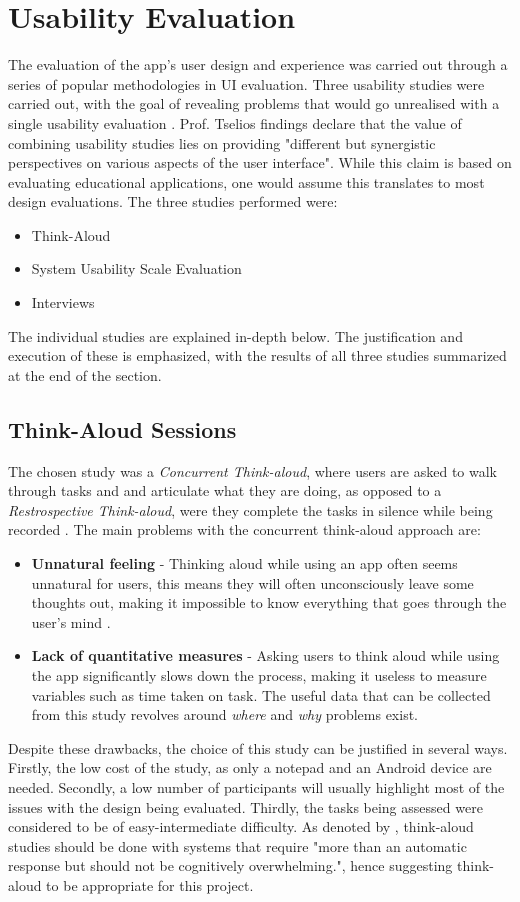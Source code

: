 \section{Usability Evaluation}
The evaluation of the app's user design and experience was carried out through a series of popular methodologies in UI evaluation. Three usability studies were carried out, with the goal of revealing problems that would go unrealised with a single usability evaluation \cite{article}. Prof. Tselios findings declare that the value of combining usability studies lies on providing "different but synergistic perspectives on various aspects of the user interface". While this claim is based on evaluating educational applications, one would assume this translates to most design evaluations. The three studies performed were:
\begin{itemize}
    \item Think-Aloud
    \item System Usability Scale Evaluation
    \item Interviews
\end{itemize}
The individual studies are explained in-depth below. The justification and execution of these is emphasized, with the results of all three studies summarized at the end of the section.
\subsection{Think-Aloud Sessions}
The chosen study was a \emph{Concurrent Think-aloud}, where users are asked to walk through tasks and and articulate what they are doing, as opposed to a  \emph{Restrospective Think-aloud}, were they complete the tasks in silence while being recorded \cite{hanington2012universal}. The main problems with the concurrent think-aloud approach are:
\begin{itemize}
    \item \textbf{Unnatural feeling} - Thinking aloud while using an app often seems unnatural for users, this means they will often unconsciously leave some thoughts out, making it impossible to know everything that goes through the user's mind \cite{rubin1996handbook}.
    \item \textbf{Lack of quantitative measures} - Asking users to think aloud while using the app significantly slows down the process, making it useless to measure variables such as time taken on task. The useful data that can be collected from this study revolves around \emph{where} and \emph{why} problems exist.
\end{itemize}
Despite these drawbacks, the choice of this study can be justified in several ways. Firstly, the low cost of the study, as only a notepad and an Android device are needed. Secondly, a low number of participants will usually highlight most of the issues with the design being evaluated. Thirdly, the tasks being assessed were considered to be of easy-intermediate difficulty. As denoted by \cite{charters2003use}, think-aloud studies should be done with systems that require "more than an automatic response but should not be cognitively overwhelming.", hence suggesting think-aloud to be appropriate for this project.

